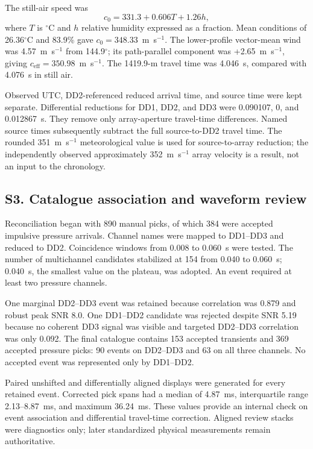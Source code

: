 \documentclass[]{seismica}
\begin{document}
The still-air speed was
\begin{equation}
 c_0=331.3+0.606T+1.26h,
\end{equation}
where $T$ is $^\circ$C and $h$ relative humidity expressed as a fraction. Mean
conditions of 26.36$^\circ$C and 83.9\% gave
$c_0=348.33$~m~s$^{-1}$. The lower-profile vector-mean wind was 4.57~m~s$^{-1}$
from 144.9$^\circ$; its path-parallel component was +2.65~m~s$^{-1}$, giving
$c_{\mathrm{eff}}=350.98$~m~s$^{-1}$. The 1419.9-m travel time was 4.046~s,
compared with 4.076~s in still air.

Observed UTC, DD2-referenced reduced arrival time, and source time were kept
separate. Differential reductions for DD1, DD2, and DD3 were 0.090107, 0, and
0.012867~s. They remove only array-aperture travel-time differences. Named
source times subsequently subtract the full source-to-DD2 travel time. The
rounded 351~m~s$^{-1}$ meteorological value is used for source-to-array
reduction; the independently observed approximately 352~m~s$^{-1}$ array
velocity is a result, not an input to the chronology.

\FloatBarrier
\subsection{S3. Catalogue association and waveform review}
\label{sec:supp_catalogue}

Reconciliation began with 890 manual picks, of which 384 were accepted
impulsive pressure arrivals. Channel names were mapped to DD1--DD3 and reduced
to DD2. Coincidence windows from 0.008 to 0.060~s were tested. The number of
multichannel candidates stabilized at 154 from 0.040 to 0.060~s; 0.040~s, the
smallest value on the plateau, was adopted. An event required at least two
pressure channels.

One marginal DD2--DD3 event was retained because correlation was 0.879 and
robust peak SNR 8.0. One DD1--DD2 candidate was rejected despite SNR 5.19
because no coherent DD3 signal was visible and targeted DD2--DD3 correlation
was only 0.092. The final catalogue contains 153 accepted transients and 369
accepted pressure picks: 90 events on DD2--DD3 and 63 on all three channels.
No accepted event was represented only by DD1--DD2.

Paired unshifted and differentially aligned displays were generated for every
retained event. Corrected pick spans had a median of 4.87~ms, interquartile
range 2.13--8.87~ms, and maximum 36.24~ms. These values provide an internal
check on event association and differential travel-time correction. Aligned
review stacks were diagnostics only; later standardized physical measurements
remain authoritative.
\end{document}
